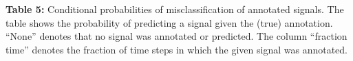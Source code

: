 \documentclass[11pt]{article}
\begin{document}
\begin{table}[h]
    \centering
    \caption*{\textbf{Table 5:} Conditional probabilities of misclassification of annotated signals. The table shows the probability of predicting a signal given the (true) annotation. “None” denotes that no signal was annotated or predicted. The column “fraction time” denotes the fraction of time steps in which the given signal was annotated.}
    \small
    
\end{table}
\end{document}
